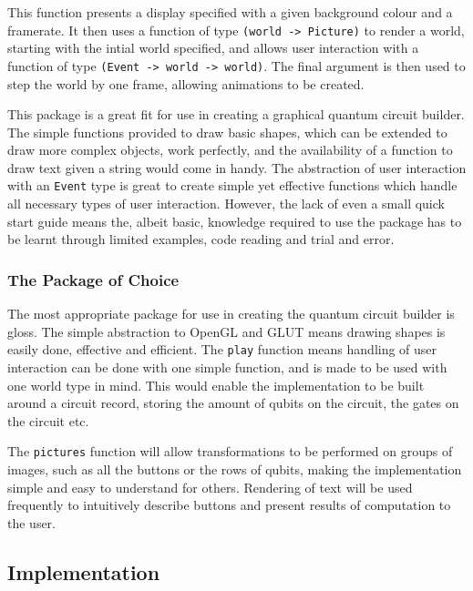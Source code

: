 \documentclass[a4paper,10pt, titlepage, twoside]{article}
\begin{document}
This function presents a display specified with a given background colour and a framerate. It then uses a function of type \texttt{(world -> Picture)} to render a world, starting with the intial world specified, and allows user interaction with a function of type \texttt{(Event -> world -> world)}. The final argument is then used to step the world by one frame, allowing animations to be created.\par
This package is a great fit for use in creating a graphical quantum circuit builder. The simple functions provided to draw basic shapes, which can be extended to draw more complex objects, work perfectly, and the availability of a function to draw text given a string would come in handy. The abstraction of user interaction with an \texttt{Event} type is great to create simple yet effective functions which handle all necessary types of user interaction. However, the lack of even a small quick start guide means the, albeit basic, knowledge required to use the package has to be learnt through limited examples, code reading and trial and error.

\subsubsection{The Package of Choice}
The most appropriate package for use in creating the quantum circuit builder is gloss. The simple abstraction to OpenGL and GLUT means drawing shapes is easily done, effective and efficient. The \texttt{play} function means handling of user interaction can be done with one simple function, and is made to be used with one world type in mind. This would enable the implementation to be built around a circuit record, storing the amount of qubits on the circuit, the gates on the circuit etc.\par
The \texttt{pictures} function will allow transformations to be performed on groups of images, such as all the buttons or the rows of qubits, making the implementation simple and easy to understand for others. Rendering of text will be used frequently to intuitively describe buttons and present results of computation to the user. 

\subsection{Implementation}
\end{document}
